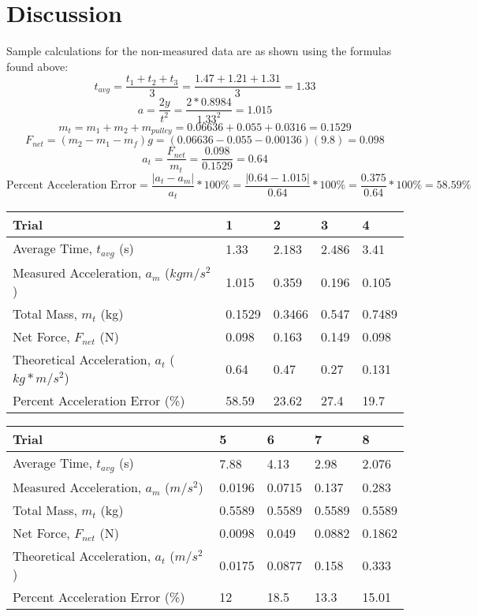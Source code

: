 \documentclass[11pt, titlepage]{article}
\begin{document}
\section*{Discussion}
Sample calculations for the non-measured data are as shown using the formulas found above:
$$t_{avg} = \frac{t_1 + t_2 + t_3}{3} = \frac{1.47 + 1.21 + 1.31}{3} = 1.33$$
$$a = \frac{2y}{t^2} = \frac{2*0.8984}{1.33^2} = 1.015$$
$$m_t = m_1 + m_2 + m_{pulley} = 0.06636 + 0.055 + 0.0316 = 0.1529$$
$$F_{net} = (m_2 - m_1 - m_f)g = (0.06636 - 0.055 - 0.00136)(9.8) = 0.098$$
$$a_t = \frac{F_{net}}{m_t} = \frac{0.098}{0.1529} = 0.64$$
$$\text{Percent Acceleration Error} = \frac{|a_t - a_m|}{a_t}*100\% = \frac{|0.64 - 1.015|}{0.64}*100\% = \frac{0.375}{0.64}*100\% = 58.59\%$$

\begin{center}
\begin{tabular}
{|m{7em}|m{7em}|m{7em}|m{7em}|m{7em}|}
\hline
Trial & 1 & 2 & 3 & 4 \\
\hline
Average Time, $t_{avg}$ (s) & 1.33 & 2.183 & 2.486 & 3.41\\
\hline
Measured Acceleration, $a_m$ ($kgm/s^2$) & 1.015 & 0.359 & 0.196 & 0.105\\
\hline
Total Mass, $m_t$ (kg) & 0.1529 & 0.3466 & 0.547 & 0.7489\\
\hline
Net Force, $F_{net}$ (N) & 0.098 & 0.163 & 0.149 & 0.098\\ 
\hline
Theoretical Acceleration, $a_t$ ($kg*m/s^2$) & 0.64 & 0.47 & 0.27 & 0.131\\
\hline
Percent Acceleration Error (\%) & 58.59 & 23.62 & 27.4 & 19.7\\
\hline
\end{tabular}
\begin{tabular}
{|m{7em}|m{7em}|m{7em}|m{7em}|m{7em}|}
\hline
Trial & 5 & 6 & 7 & 8 \\
\hline
Average Time, $t_{avg}$ (s) & 7.88 & 4.13 & 2.98 & 2.076 \\
\hline
Measured Acceleration, $a_m$ ($m/s^2$) & 0.0196 & 0.0715 & 0.137& 0.283\\
\hline
Total Mass, $m_t$ (kg) & 0.5589 & 0.5589 & 0.5589 & 0.5589\\
\hline
Net Force, $F_{net}$ (N) & 0.0098 & 0.049 & 0.0882 & 0.1862\\ 
\hline
Theoretical Acceleration, $a_t$ ($m/s^2$) & 0.0175 & 0.0877 & 0.158 & 0.333 \\
\hline
Percent Acceleration Error (\%) & 12 & 18.5 & 13.3 & 15.01 \\
\hline
\end{tabular}
\end{center}
\end{document}
